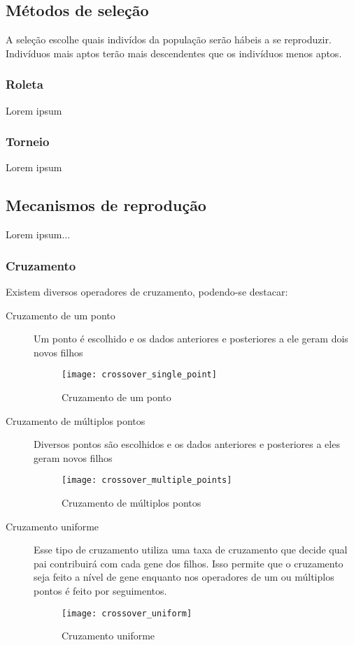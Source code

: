 \subsection{Métodos de seleção}
A seleção escolhe quais indivídos da população serão hábeis a se reproduzir. Indivíduos mais aptos terão mais descendentes que os indivíduos menos aptos.

    \subsubsection{Roleta}
    Lorem ipsum

    \subsubsection{Torneio}
    Lorem ipsum

\subsection{Mecanismos de reprodução}
Lorem ipsum...

    \subsubsection{Cruzamento}
    Existem diversos operadores de cruzamento, podendo-se destacar:
    
    \begin{description}
      \item[Cruzamento de um ponto] 
        Um ponto é escolhido e os dados anteriores e posteriores a ele geram dois novos filhos
        \begin{figure}[!ht]
          \centering
          \texttt{[image: crossover\_single\_point]}
          \caption{Cruzamento de um ponto}
        \end{figure}
      \item[Cruzamento de múltiplos pontos]
        Diversos pontos são escolhidos e os dados anteriores e posteriores a eles geram novos filhos
        \begin{figure}[!ht]
          \centering
          \texttt{[image: crossover\_multiple\_points]}
          \caption{Cruzamento de múltiplos pontos}
        \end{figure}
      \item[Cruzamento uniforme]
        Esse tipo de cruzamento utiliza uma taxa de cruzamento que decide qual pai contribuirá com cada gene dos filhos. 
        Isso permite que o cruzamento seja feito a nível de gene enquanto nos operadores de um ou múltiplos pontos é 
        feito por seguimentos.
        \begin{figure}[!ht]
          \centering
          \texttt{[image: crossover\_uniform]}
          \caption{Cruzamento uniforme}
        \end{figure}
    \end{description}

